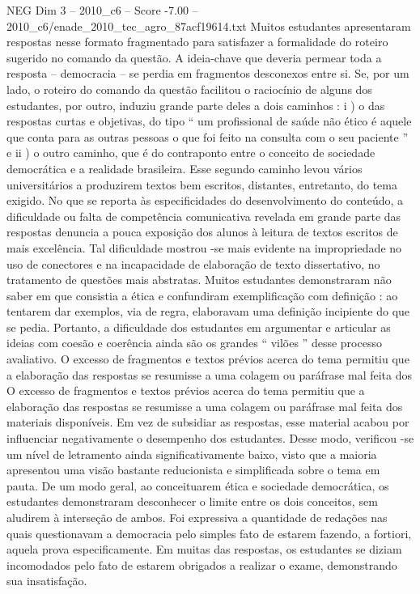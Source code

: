 \begin{textsample}{NEG Dim 3 – 2010\_c6 – Score -7.00 – 2010\_c6/enade\_2010\_tec\_agro\_87acf19614.txt}
Muitos estudantes apresentaram respostas nesse formato fragmentado para satisfazer a formalidade do roteiro sugerido no comando da questão.
A ideia-chave que deveria permear toda a resposta – democracia – se perdia em fragmentos desconexos entre si.
Se, por um lado, o roteiro do comando da questão facilitou o raciocínio de alguns dos estudantes, por outro, induziu grande parte deles a dois caminhos : i ) o das respostas curtas e objetivas, do tipo “ um profissional de saúde não ético é aquele que conta para as outras pessoas o que foi feito na consulta com o seu paciente ” e ii ) o outro caminho, que é do contraponto entre o conceito de sociedade democrática e a realidade brasileira.
Esse segundo caminho levou vários universitários a produzirem textos bem escritos, distantes, entretanto, do tema exigido.
No que se reporta às especificidades do desenvolvimento do conteúdo, a dificuldade ou falta de competência comunicativa revelada em grande parte das respostas denuncia a pouca exposição dos alunos à leitura de textos escritos de mais excelência.
Tal dificuldade mostrou -se mais evidente na impropriedade no uso de conectores e na incapacidade de elaboração de texto dissertativo, no tratamento de questões mais abstratas.
Muitos estudantes demonstraram não saber em que consistia a ética e confundiram exemplificação com definição : ao tentarem dar exemplos, via de regra, elaboravam uma definição incipiente do que se pedia.
Portanto, a dificuldade dos estudantes em argumentar e articular as ideias com coesão e coerência ainda são os grandes “ vilões ” desse processo avaliativo.
O excesso de fragmentos e textos prévios acerca do tema permitiu que a elaboração das respostas se resumisse a uma colagem ou paráfrase mal feita dos O excesso de fragmentos e textos prévios acerca do tema permitiu que a elaboração das respostas se resumisse a uma colagem ou paráfrase mal feita dos materiais disponíveis.
Em vez de subsidiar as respostas, esse material acabou por influenciar negativamente o desempenho dos estudantes.
Desse modo, verificou -se um nível de letramento ainda significativamente baixo, visto que a maioria apresentou uma visão bastante reducionista e simplificada sobre o tema em pauta.
De um modo geral, ao conceituarem ética e sociedade democrática, os estudantes demonstraram desconhecer o limite entre os dois conceitos, sem aludirem à interseção de ambos.
Foi expressiva a quantidade de redações nas quais questionavam a democracia pelo simples fato de estarem fazendo, a fortiori, aquela prova especificamente.
Em muitas das respostas, os estudantes se diziam incomodados pelo fato de estarem obrigados a realizar o exame, demonstrando sua insatisfação.

\end{textsample}
